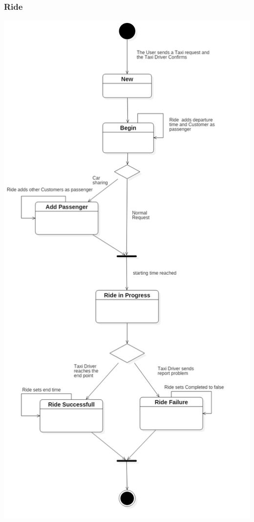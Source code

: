 \documentclass[english]{article}
\begin{document}
\subsubsection{Ride}

\includegraphics[width=\textwidth,height=\textheight,keepaspectratio]{RideBehavior}
\end{document}
